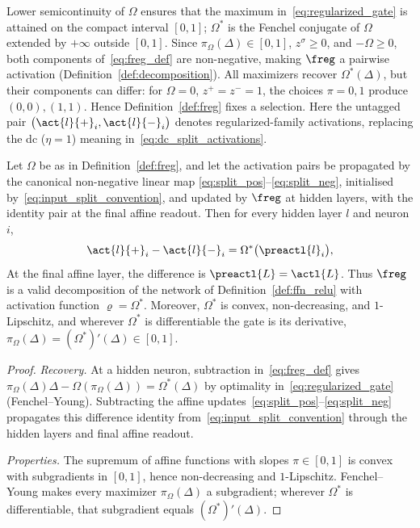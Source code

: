 Lower semicontinuity of $\Omega$ ensures that the maximum in~\eqref{eq:regularized_gate} is attained on the compact interval $[0,1]$; $\Omega^*$ is the Fenchel conjugate of $\Omega$ extended by $+\infty$ outside $[0,1]$. Since $\pi_\Omega(\Delta) \in [0,1]$, $z^\sigma \ge 0$, and $-\Omega \ge 0$, both components of~\eqref{eq:freg_def} are non-negative, making $\freg$ a pairwise activation (Definition~\ref{def:decomposition}). All maximizers recover $\Omega^*(\Delta)$, but their components can differ: for $\Omega=0$, $z^+=z^-=1$, the choices $\pi=0,1$ produce $(0,0),(1,1)$. Hence Definition~\ref{def:freg} fixes a selection. Here the untagged pair $\bigl(\act{l}{+}_i, \act{l}{-}_i\bigr)$ denotes regularized-family activations, replacing the \ac{dc} ($\eta=1$) meaning in~\eqref{eq:dc_split_activations}.

\begin{theoremenv}\label{thm:freg_validity}
Let $\Omega$ be as in Definition~\ref{def:freg}, and let the activation pairs be propagated by the canonical non-negative linear map \eqref{eq:split_pos}--\eqref{eq:split_neg}, initialised by~\eqref{eq:input_split_convention}, and updated by $\freg$ at hidden layers, with the identity pair at the final affine readout. Then for every hidden layer $l$ and neuron $i$,
\begin{equation}
	\act{l}{+}_i - \act{l}{-}_i = \Omega^*\bigl(\preactl{l}_i\bigr),
	\label{eq:freg_recovery}
\end{equation}
At the final affine layer, the difference is $\preactl{L}=\actl{L}$. Thus $\freg$ is a valid decomposition of the network of Definition~\ref{def:ffn_relu} with activation function $\varrho = \Omega^*$. Moreover, $\Omega^*$ is convex, non-decreasing, and $1$-Lipschitz, and wherever $\Omega^*$ is differentiable the gate is its derivative, $\pi_\Omega(\Delta) = (\Omega^*)'(\Delta) \in [0,1]$.\end{theoremenv}

\begin{proof}
\emph{Recovery.} At a hidden neuron, subtraction in~\eqref{eq:freg_def} gives $\pi_\Omega(\Delta)\Delta-\Omega(\pi_\Omega(\Delta))=\Omega^*(\Delta)$ by optimality in~\eqref{eq:regularized_gate} (Fenchel--Young). Subtracting the affine updates~\eqref{eq:split_pos}--\eqref{eq:split_neg} propagates this difference identity from~\eqref{eq:input_split_convention} through the hidden layers and final affine readout.

\emph{Properties.} The supremum of affine functions with slopes $\pi\in[0,1]$ is convex with subgradients in $[0,1]$, hence non-decreasing and $1$-Lipschitz. Fenchel--Young makes every maximizer $\pi_\Omega(\Delta)$ a subgradient; wherever $\Omega^*$ is differentiable, that subgradient equals $(\Omega^*)'(\Delta)$.
\end{proof}

